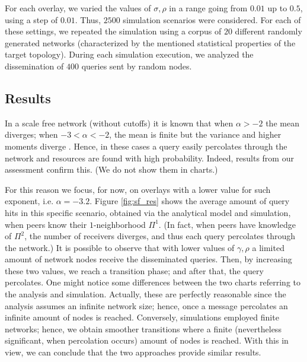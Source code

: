 \documentclass{sig-alternate}
\begin{document}
For each overlay, we varied the values of $\sigma, \rho$ in a range going from $0.01$ up to $0.5$, using a step of $0.01$. Thus, $2500$ simulation scenarios were considered. 
For each of these settings, we repeated the simulation using a corpus of $20$ different randomly generated networks (characterized by the mentioned statistical properties of the target topology). During each simulation execution, we analyzed the dissemination of $400$ queries sent by random nodes. 



\subsection{Results}

In a scale free network (without cutoffs) it is known that when $\alpha > -2$ the mean diverges; when $-3 < \alpha < -2$, the mean is finite but the variance and higher moments diverge \cite{newmanHandbook}. Hence, in these cases a query easily percolates through the network and resources are found with high probability. 
Indeed, results from our assessment confirm this. (We do not show them in charts.)

For this reason we focus, for now, on overlays with a lower value for such exponent, i.e. $\alpha=-3.2$.
Figure \ref{fig:sf_res} shows the average amount of query hits in this specific scenario, obtained via the analytical model and simulation, when peers know their $1$-neighborhood $\Pi^1$. (In fact, when peers have knowledge of $\Pi^2$, the number of receivers diverges, and thus each query percolates through the network.)
It is possible to observe that with lower values of $\gamma, \rho$ a limited amount of network nodes receive the disseminated queries. Then, by increasing these two values, we reach a transition phase; and after that, the query percolates.
One might notice some differences between the two charts referring to the analysis and simulation. Actually, these are perfectly reasonable since the analysis assumes an infinite network size; hence, once a message percolates an infinite amount of nodes is reached. Conversely, simulations employed finite networks; hence, we obtain smoother transitions where a finite (nevertheless significant, when percolation occurs) amount of nodes is reached.
With this in view, we can conclude that the two approaches provide similar results.
\end{document}
